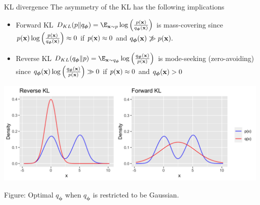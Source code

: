 \documentclass[11pt,compress,t,notes=noshow, xcolor=table]{beamer}
\begin{document}
\begin{vbframe}{KL divergence}
The asymmetry of the KL has the following implications
\begin{itemize}
    \item Forward KL $D_{KL}(p\|q_{\bm{\phi}}) = \E_{\xv \sim p} \log\left(\frac{p(\xv)}{q_{\bm{\phi}}(\xv)}\right)$ is mass-covering since $p(\mathbf{x})\log\left(\frac{p(\mathbf{x})}{q_{\bm{\phi}}(\mathbf{x})}\right) \approx 0$ if $p(\mathbf{x}) \approx 0$ and $q_{\bm{\phi}}(\mathbf{x}) \not\gg p(\mathbf{x}).$
        \item Reverse KL $D_{KL}(q_{\bm{\phi}}\|p) = \E_{\xv \sim q_{\bm{\phi}}} \log\left(\frac{q_{\bm{\phi}}(\xv)}{p(\xv)}\right)$ is mode-seeking (zero-avoiding) since $q_{\bm{\phi}}(\mathbf{x})\log\left(\frac{q_{\bm{\phi}}(\mathbf{x})}{p(\mathbf{x})}\right) \gg 0$ if $p(\mathbf{x}) \approx 0$ and $q_{\bm{\phi}}(\mathbf{x}) > 0$ 
\end{itemize}
 \begin{center}
\includegraphics[width=0.7\linewidth]{figure/kl_fitting_plot.png}
\end{center}
\small Figure: Optimal $q_{\bm{\phi}}$ when $q_{\bm{\phi}}$ is restricted to be Gaussian.
\end{vbframe}

\endlecture
\end{document}
